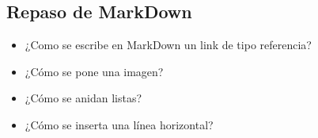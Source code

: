 \subsection{Repaso de MarkDown}\label{repaso-de-markdown}

\begin{itemize}
\itemsep1pt\parskip0pt
\item
  ¿Como se escribe en MarkDown un link de tipo referencia?
\item
  ¿Cómo se pone una imagen?
\item
  ¿Cómo se anidan listas?
\item
  ¿Cómo se inserta una línea horizontal?
\end{itemize}
